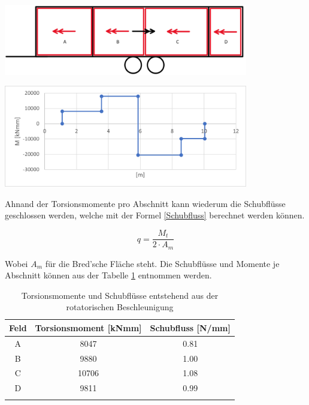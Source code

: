 \begin{center}
  \includegraphics[width=0.8\textwidth]{04_Figures/1.5 Momente.png}
  \label{1.5 Momente}
\end{center}

\begin{center}
  \includegraphics[width=0.8\textwidth]{04_Figures/1.5 Momentenverlauf.png}
  \label{1.5 Momentenverlauf}
\end{center}

Ahnand der Torsionsmomente pro Abschnitt kann wiederum die Schubflüsse geschlossen werden, welche mit der Formel \ref{Schubfluss} berechnet werden können.

\begin{equation}
  q = \frac{M_t}{2 \cdot A_m}
  \label{Schubfluss}
\end{equation}

Wobei $A_m$ für die Bred'sche Fläche steht.
Die Schubflüsse und Momente je Abschnitt können aus der Tabelle \ref{Schubfluss resultat} entnommen werden.


\begin{table}[h!]
  \centering
  \begin{tabular}{ccc}
    \thickhline
    Feld & Torsionsmoment [kNmm] & Schubfluss [N/mm] \\ \hline
    A    & 8047                  & 0.81\\
    B    & 9880                  & 1.00\\
    C    & 10706                 & 1.08\\
    D    & 9811                  & 0.99\\
    \thickhline
  \end{tabular}
\caption{Torsionsmomente und Schubflüsse entstehend aus der rotatorischen Beschleunigung}%
\label{Schubfluss resultat}
\end{table}

